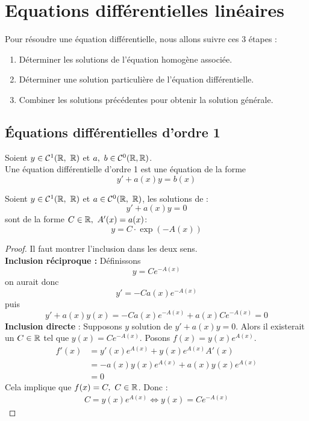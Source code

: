 \chapter{Equations différentielles linéaires}
\def\arraystretch{1}

\noindent Pour résoudre une équation différentielle, nous allons suivre ces 3 étapes :
\begin{enumerate}
	\item Déterminer les solutions de l'équation homogène associée.
	\item Déterminer une solution particulière de l'équation différentielle.
	\item Combiner les solutions précédentes pour obtenir la solution générale.
\end{enumerate}

\section{\'Equations différentielles d'ordre 1}

\begin{definition}
	Soient $y \in \mathcal{C}^1(\R,\ \R)$ et $a,\ b \in \mathcal{C}^0(\mathbb{R},\mathbb{R})$. \\
	Une équation différentielle d'ordre 1 est une équation de la forme
	\[ y' + a(x)y = b(x) \]
\end{definition}

\begin{theorem}
	Soient $y \in \mathcal{C}^1(\R,\ \R)$ et $a \in \mathcal{C}^0(\R,\ \R)$, les solutions de :
	\[ y' + a(x)y = 0 \]
	sont de la forme $C \in \mathbb{R},\ A'(x) = a(x)$:
	\[ y = C \cdot \exp(-A(x)) \]
\end{theorem}

\begin{proof}
    Il faut montrer l'inclusion dans les deux sens. \\
    \textbf{Inclusion réciproque :}
	Définissons
	\[ y = C e^{-A(x)} \]
	on aurait donc
	\[ y' = -C a(x)e^{-A(x)} \]
	puis
	\[ y' + a(x)y(x) = -C a(x) e^{-A(x)} + a(x)Ce^{-A(x)} = 0 \]
    \textbf{Inclusion directe} \cite{bibmath_resolution_eq_diff} :
    Supposons $y$ solution de $y' + a(x) y = 0$.
    Alors il existerait un $C \in \mathbb{R}$ tel que $y(x) = Ce^{-A(x)}$.
    Posons $f(x) = y(x)e^{A(x)}$.
    \begin{align*}
        f'(x) &= y'(x)e^{A(x)} + y(x)e^{A(x)}A'(x) \\
        &= -a(x)y(x)e^{A(x)} + a(x)y(x)e^{A(x)} \\
        &= 0
    \end{align*}
    Cela implique que $f(x) = C,\ C \in \mathbb{R}$. Donc :
    \begin{align*}
        C = y(x)e^{A(x)} \iff y(x) = Ce^{-A(x)}
    \end{align*}
\end{proof}

